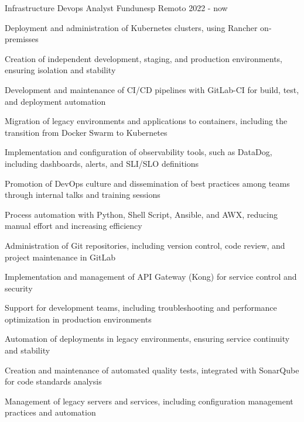 

\begin{cventries}


\cventry
{Infrastructure Devops Analyst} %
{Fundunesp} %
{Remoto} %
{2022 - now} %
{
  \begin{cvitems} %
    \begin{cvitems}
      \item {Deployment and administration of Kubernetes clusters, using Rancher on-premisses}
      \item {Creation of independent development, staging, and production environments, ensuring isolation and stability}
      \item {Development and maintenance of CI/CD pipelines with GitLab-CI for build, test, and deployment automation}
      \item {Migration of legacy environments and applications to containers, including the transition from Docker Swarm to Kubernetes}
      \item {Implementation and configuration of observability tools, such as DataDog, including dashboards, alerts, and SLI/SLO definitions}
      \item {Promotion of DevOps culture and dissemination of best practices among teams through internal talks and training sessions}
      \item {Process automation with Python, Shell Script, Ansible, and AWX, reducing manual effort and increasing efficiency}
      \item {Administration of Git repositories, including version control, code review, and project maintenance in GitLab}
      \item {Implementation and management of API Gateway (Kong) for service control and security}
      \item {Support for development teams, including troubleshooting and performance optimization in production environments}
      \item {Automation of deployments in legacy environments, ensuring service continuity and stability}
      \item {Creation and maintenance of automated quality tests, integrated with SonarQube for code standards analysis}
      \item {Management of legacy servers and services, including configuration management practices and automation}
  \end{cvitems}
  \end{cvitems}
}


\end{cventries}
